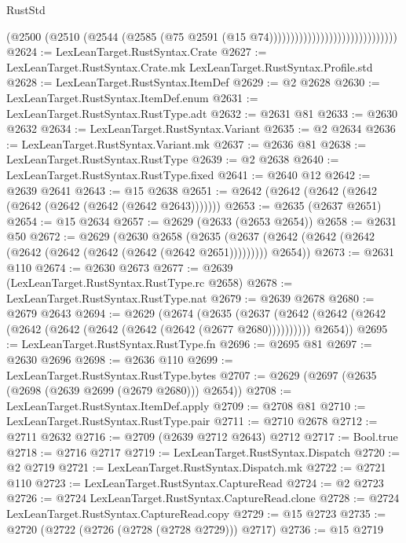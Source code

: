\begin{lexlean}{RustStd}
\begin{coremodule}
{\begin{coremodule}
{{{{{{{{{{{{{{{{{{{{{{{{{{{{{{{{{                                                    (@2500
                                                      (@2510
                                                        (@2544
                                                          (@2585
                                                            (@75
                                                              @2591
                                                              (@15 @74))))))))))))))))))))))))))))))
@2624 := LexLeanTarget.RustSyntax.Crate
@2627 := LexLeanTarget.RustSyntax.Crate.mk LexLeanTarget.RustSyntax.Profile.std
@2628 := LexLeanTarget.RustSyntax.ItemDef
@2629 := @2 @2628
@2630 := LexLeanTarget.RustSyntax.ItemDef.enum
@2631 := LexLeanTarget.RustSyntax.RustType.adt
@2632 := @2631 @81
@2633 := @2630 @2632
@2634 := LexLeanTarget.RustSyntax.Variant
@2635 := @2 @2634
@2636 := LexLeanTarget.RustSyntax.Variant.mk
@2637 := @2636 @81
@2638 := LexLeanTarget.RustSyntax.RustType
@2639 := @2 @2638
@2640 := LexLeanTarget.RustSyntax.RustType.fixed
@2641 := @2640 @12
@2642 := @2639 @2641
@2643 := @15 @2638
@2651 := @2642 (@2642 (@2642 (@2642 (@2642 (@2642 (@2642 (@2642 @2643)))))))
@2653 := @2635 (@2637 @2651)
@2654 := @15 @2634
@2657 := @2629 (@2633 (@2653 @2654))
@2658 := @2631 @50
@2672 := @2629
    (@2630
      @2658
      (@2635 (@2637 (@2642 (@2642 (@2642 (@2642 (@2642 (@2642 (@2642 (@2642 @2651))))))))) @2654))
@2673 := @2631 @110
@2674 := @2630 @2673
@2677 := @2639 (LexLeanTarget.RustSyntax.RustType.rc @2658)
@2678 := LexLeanTarget.RustSyntax.RustType.nat
@2679 := @2639 @2678
@2680 := @2679 @2643
@2694 := @2629
    (@2674
      (@2635
        (@2637 (@2642 (@2642 (@2642 (@2642 (@2642 (@2642 (@2642 (@2642 (@2677 @2680))))))))))
        @2654))
@2695 := LexLeanTarget.RustSyntax.RustType.fn
@2696 := @2695 @81
@2697 := @2630 @2696
@2698 := @2636 @110
@2699 := LexLeanTarget.RustSyntax.RustType.bytes
@2707 := @2629 (@2697 (@2635 (@2698 (@2639 @2699 (@2679 @2680))) @2654))
@2708 := LexLeanTarget.RustSyntax.ItemDef.apply
@2709 := @2708 @81
@2710 := LexLeanTarget.RustSyntax.RustType.pair
@2711 := @2710 @2678
@2712 := @2711 @2632
@2716 := @2709 (@2639 @2712 @2643) @2712
@2717 := Bool.true
@2718 := @2716 @2717
@2719 := LexLeanTarget.RustSyntax.Dispatch
@2720 := @2 @2719
@2721 := LexLeanTarget.RustSyntax.Dispatch.mk
@2722 := @2721 @110
@2723 := LexLeanTarget.RustSyntax.CaptureRead
@2724 := @2 @2723
@2726 := @2724 LexLeanTarget.RustSyntax.CaptureRead.clone
@2728 := @2724 LexLeanTarget.RustSyntax.CaptureRead.copy
@2729 := @15 @2723
@2735 := @2720 (@2722 (@2726 (@2728 (@2728 @2729))) @2717)
@2736 := @15 @2719
}}}}}}}}}}}}}}}}}}}}}}}}}}}}}}}}}
\end{coremodule}}
\end{coremodule}
\end{lexlean}
